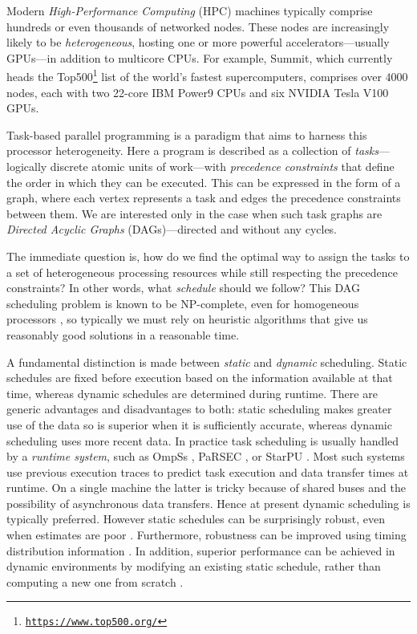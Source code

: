 \documentclass[runningheads]{llncs}
\begin{document}
Modern {\em High-Performance Computing} (HPC) machines typically comprise hundreds or even thousands of networked nodes. These nodes are increasingly likely to be {\em heterogeneous}, hosting one or more powerful accelerators---usually GPUs---in addition to multicore CPUs. For example, Summit, which currently heads the Top500\footnote{\href{https://www.top500.org/}{{\tt \small https://www.top500.org/}}} list of the world's fastest supercomputers, comprises over $4000$ nodes, each with two 22-core IBM Power9 CPUs and six NVIDIA Tesla V100 GPUs. 

Task-based parallel programming is a paradigm that aims to harness this processor heterogeneity. Here a program is described as a collection of {\em tasks}---logically discrete atomic units of work---with {\em precedence constraints} that define the order in which they can be executed. This can be expressed in the form of a graph, where each vertex represents a task and edges the precedence constraints between them. We are interested only in the case when such task graphs are {\em Directed Acyclic Graphs} (DAGs)---directed and without any cycles.  

The immediate question is, how do we find the optimal way to assign the tasks to a set of heterogeneous processing resources while still respecting the precedence constraints? In other words, what {\em schedule} should we follow? This DAG scheduling problem is known to be NP-complete, even for homogeneous processors \cite{topcuoglu2002performance}, so typically we must rely on heuristic algorithms that give us reasonably good solutions in a reasonable time.

A fundamental distinction is made between {\em static} and {\em dynamic} scheduling. Static schedules are fixed before execution based on the information available at that time, whereas dynamic schedules are determined during runtime. There are generic advantages and disadvantages to both: static scheduling makes greater use of the data so is superior when it is sufficiently accurate, whereas dynamic scheduling uses more recent data. In practice task scheduling is usually handled by a {\em runtime system}, such as OmpSs \cite{duran2011ompss}, PaRSEC \cite{bosilca2013parsec}, or StarPU \cite{augonnet2011starpu}. Most such systems use previous execution traces to predict task execution and data transfer times at runtime. On a single machine the latter is tricky because of shared buses and the possibility of asynchronous data transfers. Hence at present dynamic scheduling is typically preferred. However static schedules can be surprisingly robust, even when estimates are poor \cite{agullo2016}. Furthermore, robustness can be improved using timing distribution information \cite{ZHENG20131673}. In addition, superior performance can be achieved in dynamic environments by modifying an existing static schedule, rather than computing a new one from scratch \cite{agullo2016}. 
\end{document}
